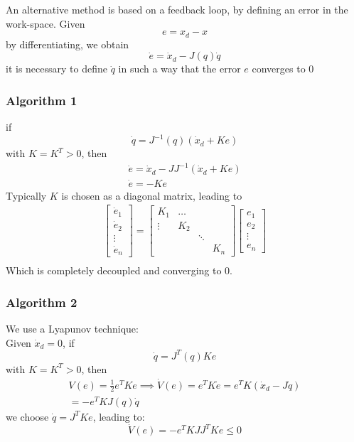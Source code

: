 \documentclass{book}
\begin{document}
An alternative method is based on a feedback loop, by defining an error in the work-space. Given
\[
    e=x_d-x
\]
by differentiating, we obtain
\[
    \dot{e}=\dot{x}_d-J(q)\dot{q}
\]
it is necessary to define $\dot{q}$ in such a way that the error $e$ converges to $0$
\subsubsection{Algorithm 1}
if
\[
    \dot{q}=J^{-1}(q)(\dot{x}_d+Ke)
\]
with $K=K^T>0$, then
\begin{gather*}
    \dot{e}=\dot{x}_d-JJ^{-1}(\dot{x}_d+Ke)\\
    \dot{e}=-Ke
\end{gather*}
Typically $K$ is chosen as a diagonal matrix, leading to
\begin{gather*}
    \begin{bmatrix}
        \dot{e}_1 \\
        \dot{e}_2 \\
        \vdots \\
        \dot{e}_n
        \end{bmatrix}=\begin{bmatrix}
        K_1 & \dots & & \\
        \vdots & K_2 & & \\
               & & \ddots & \\
        & & & K_n
    \end{bmatrix} 
    \begin{bmatrix}
        e_1 \\
        e_2 \\
        \vdots \\
        e_n
        \end{bmatrix} \\
    \end{gather*}
Which is completely decoupled and converging to 0.
\subsubsection{Algorithm 2}
We use a Lyapunov technique:\\
Given $\dot{x}_d=0$, if
\[
    \dot{q}=J^T(q)Ke
\]
with $K=K^T>0$, then
\begin{gather*}
    V(e)=\frac{1}{2}e^TKe \implies \dot{V}(e)=e^TK\dot{e}=e^TK(\dot{x}_d-J\dot{q})\\
    =-e^TKJ(q)\dot{q}
\end{gather*}
we choose $\dot{q}=J^TKe$, leading to:
\[
    \dot{V}(e)=-e^TKJJ^TKe \leq 0
\]
\end{document}
